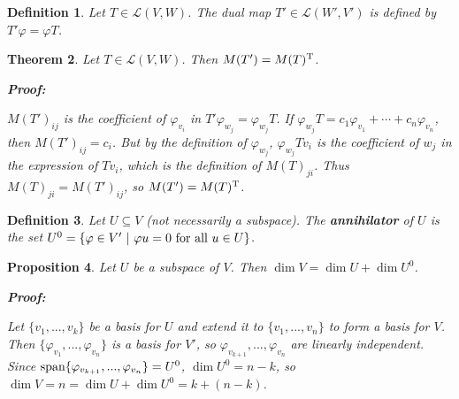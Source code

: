 \documentclass{article}
\theoremstyle{colontheorem}
\newtheorem{theorem}{Theorem}[section]
\newtheorem{proposition}[theorem]{Proposition}
\newtheorem{definition}[theorem]{Definition}
\newcommand{\Span}{\textnormal{span}}
\newenvironment{Theorem}
{
	\begin{mdframed}[backgroundcolor=TheoremOrange!10]
	\begin{theorem}
}
{
	\end{theorem}
	\end{mdframed}
	
	\vspace{.15in}
}
\newenvironment{Proposition}
{
	\begin{mdframed}[backgroundcolor=TheoremOrange!10]
	\begin{proposition}
}
{
	\end{proposition}
	\end{mdframed}
	
	\vspace{.15in}
}
\newenvironment{Def}
{
	\begin{mdframed}[backgroundcolor=DefGreen!10]
	\begin{definition}
}
{
	\end{definition}
	\end{mdframed}
	
	\vspace{.15in}
}
\newenvironment{Proof}
{
	\begin{mdframed}[backgroundcolor=ProofPurple!10]
	\textbf{Proof:}%
}
{
	\end{mdframed}
	
	\vspace{.085in}
}
\begin{document}
\begin{Def}
	
	Let $T \in \mathcal{L}(V,W)$. The dual map $T' \in \mathcal{L}(W',V')$ is defined by $T'\varphi = \varphi T$.
	
\end{Def}



\begin{Theorem}
	
	Let $T \in \mathcal{L}(V,W)$. Then $M(T') = M(T)^\textnormal{T}$.
	
	\begin{Proof}
		$M(T')_{ij}$ is the coefficient of $\varphi_{v_i}$ in $T'\varphi_{w_j} = \varphi_{w_j} T$. If $\varphi_{w_j} T = c_1 \varphi_{v_1} + \cdots + c_n \varphi_{v_n}$, then $M(T')_{ij} = c_i$. But by the definition of $\varphi_{w_j}$, $\varphi_{w_j} Tv_i$ is the coefficient of $w_j$ in the expression of $Tv_i$, which is the definition of $M(T)_{ji}$. Thus $M(T)_{ji} = M(T')_{ij}$, so $M(T') = M(T)^\textnormal{T}$.
		
	\end{Proof}
	
\end{Theorem}



\begin{Def}
	
	Let $U \subseteq V$ (not necessarily a subspace). The \textbf{annihilator} of $U$ is the set $U^0 = \{\varphi \in V'\ |\ \varphi u = 0\ \textnormal{for all}\ u \in U\}$.
	
\end{Def}



\begin{Proposition}
	
	Let $U$ be a subspace of $V$. Then $\dim V = \dim U + \dim U^0$.
	
	\pagebreak
	
	\begin{Proof}
		Let $\{v_1, ..., v_k\}$ be a basis for $U$ and extend it to $\{v_1, ..., v_n\}$ to form a basis for $V$. Then $\{\varphi_{v_1}, ..., \varphi_{v_n}\}$ is a basis for $V'$, so $\varphi_{v_{k+1}}, ..., \varphi_{v_n}$ are linearly independent. Since $\Span \{\varphi_{v_{k+1}}, ..., \varphi_{v_n}\} = U^0$, $\dim U^0 = n-k$, so $\dim V = n = \dim U + \dim U^0 = k + (n - k)$.
		
	\end{Proof}
	
\end{Proposition}
\end{document}
